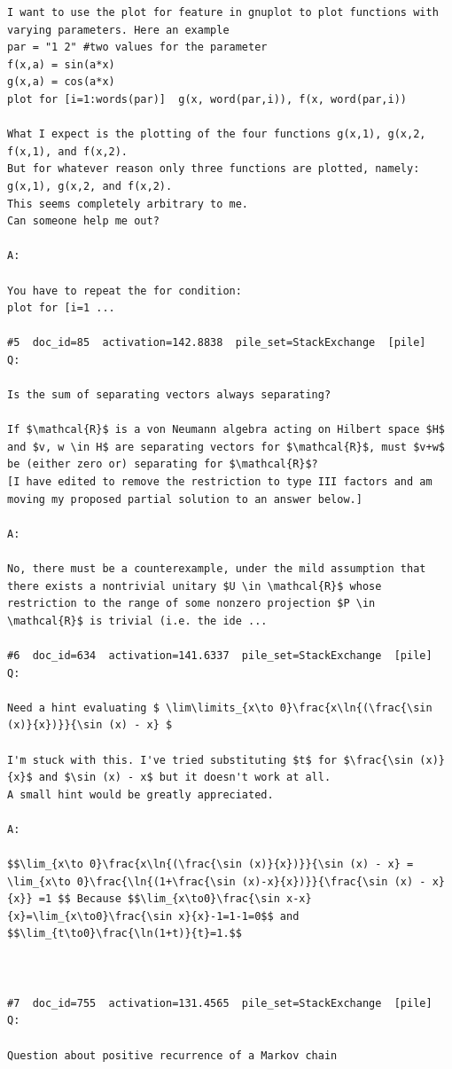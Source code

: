 \begin{verbatim}
I want to use the plot for feature in gnuplot to plot functions with varying parameters. Here an example
par = "1 2" #two values for the parameter
f(x,a) = sin(a*x)
g(x,a) = cos(a*x)
plot for [i=1:words(par)]  g(x, word(par,i)), f(x, word(par,i))

What I expect is the plotting of the four functions g(x,1), g(x,2, f(x,1), and f(x,2).
But for whatever reason only three functions are plotted, namely: g(x,1), g(x,2, and f(x,2).
This seems completely arbitrary to me.
Can someone help me out?

A:

You have to repeat the for condition:
plot for [i=1 ...

#5  doc_id=85  activation=142.8838  pile_set=StackExchange  [pile]
Q:

Is the sum of separating vectors always separating?

If $\mathcal{R}$ is a von Neumann algebra acting on Hilbert space $H$ and $v, w \in H$ are separating vectors for $\mathcal{R}$, must $v+w$ be (either zero or) separating for $\mathcal{R}$?
[I have edited to remove the restriction to type III factors and am moving my proposed partial solution to an answer below.]

A:

No, there must be a counterexample, under the mild assumption that there exists a nontrivial unitary $U \in \mathcal{R}$ whose restriction to the range of some nonzero projection $P \in \mathcal{R}$ is trivial (i.e. the ide ...

#6  doc_id=634  activation=141.6337  pile_set=StackExchange  [pile]
Q:

Need a hint evaluating $ \lim\limits_{x\to 0}\frac{x\ln{(\frac{\sin (x)}{x})}}{\sin (x) - x} $

I'm stuck with this. I've tried substituting $t$ for $\frac{\sin (x)}{x}$ and $\sin (x) - x$ but it doesn't work at all. 
A small hint would be greatly appreciated. 

A:

$$\lim_{x\to 0}\frac{x\ln{(\frac{\sin (x)}{x})}}{\sin (x) - x} =  \lim_{x\to 0}\frac{\ln{(1+\frac{\sin (x)-x}{x})}}{\frac{\sin (x) - x}{x}} =1 $$ Because $$\lim_{x\to0}\frac{\sin x-x}{x}=\lim_{x\to0}\frac{\sin x}{x}-1=1-1=0$$ and $$\lim_{t\to0}\frac{\ln(1+t)}{t}=1.$$



#7  doc_id=755  activation=131.4565  pile_set=StackExchange  [pile]
Q:

Question about positive recurrence of a Markov chain


\end{verbatim}
